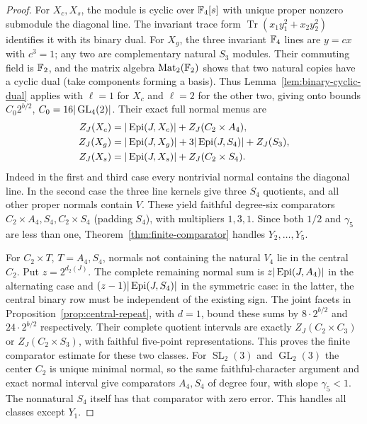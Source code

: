 \begin{proof}
For $X_c,X_s$, the module is cyclic over $\mathbb F_4[s]$ with unique
proper nonzero submodule the diagonal line. The invariant trace
form $\operatorname{Tr}(x_1y_1^2+x_2y_2^2)$ identifies it with
its binary dual. For $X_g$, the three invariant $\mathbb F_4$ lines are
$y=cx$ with $c^3=1$; any two are complementary natural $S_3$
modules. Their commuting field is $\mathbb F_2$, and the matrix algebra
$\mathrm{Mat}_2(\mathbb F_2)$ shows that two natural copies have a
cyclic dual (take components forming a basis). Thus
Lemma~\ref{lem:binary-cyclic-dual} applies with $\ell=1$ for
$X_c$ and $\ell=2$ for the other two, giving onto bounds
$C_0 2^{b/2}$, $C_0=16|\operatorname{GL}_4(2)|$.
Their exact full normal menus are
\begin{align*}
 Z_J(X_c)&=|\operatorname{Epi}(J,X_c)|+Z_J(C_2\times A_4),\\
 Z_J(X_g)&=|\operatorname{Epi}(J,X_g)|+3|\operatorname{Epi}(J,S_4)|+Z_J(S_3),\\
 Z_J(X_s)&=|\operatorname{Epi}(J,X_s)|+Z_J(C_2\times S_4).
\end{align*}
Indeed in the first and third case every nontrivial normal
contains the diagonal line. In the second case the three line
kernels give three $S_4$ quotients, and all other proper normals
contain $V$. These yield faithful degree-six comparators
$C_2\times A_4,S_4,C_2\times S_4$ (padding $S_4$), with
multipliers $1,3,1$. Since both $1/2$ and $\gamma_5$ are less than
one, Theorem~\ref{thm:finite-comparator} handles $Y_2,\ldots,Y_5$.

For $C_2\times T$, $T=A_4,S_4$, normals not containing the
natural $V_4$ lie in the central $C_2$. Put $z=2^{d_2(J)}$.
The complete remaining normal sum is $z|\operatorname{Epi}(J,A_4)|$ in the
alternating case and $(z-1)|\operatorname{Epi}(J,S_4)|$ in the symmetric case:
in the latter, the central binary row must be independent of the
existing sign. The joint facets in
Proposition~\ref{prop:central-repeat}, with $d=1$, bound these
sums by $8\cdot2^{b/2}$ and $24\cdot2^{b/2}$ respectively.
Their complete quotient intervals are exactly
$Z_J(C_2\times C_3)$ or $Z_J(C_2\times S_3)$, with faithful
five-point representations. This proves the finite comparator
estimate for these two classes. For $\operatorname{SL}_2(3)$
and $\operatorname{GL}_2(3)$ the center $C_2$ is unique minimal
normal, so the same faithful-character argument and exact normal
interval give comparators $A_4,S_4$ of degree four, with slope
$\gamma_5<1$. The nonnatural $S_4$ itself has that comparator with
zero error. This handles all classes except $Y_1$.


\end{proof}
